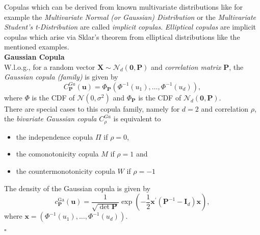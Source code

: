
Copulas which can be derived from known multivariate distributions like for example the \textit{Multivariate Normal (or Gaussian) Distribution} or the \textit{Multivariate Student's t-Distribution} are called \textit{implicit copulas}. \textit{Elliptical copulas} are implicit copulas which arise via Sklar's theorem from elliptical distributions like the mentioned examples.\\

\textbf{Gaussian Copula}\\
W.l.o.g., for a random vector $\bm{X} \sim {\mathcal{N}_{d}(\bm{0}, \mathbf{P})} $ and \textit{correlation matrix} $\bm{P}$,
the \textit{Gaussian copula (family)} is given by
\begin{equation}
C_{\mathbf{P}}^{G a}(\mathbf{u})=\Phi_{\mathbf{P}}\left(\Phi^{-1}\left(u_{1}\right), \ldots, \Phi^{-1}\left(u_{d}\right)\right),
\end{equation}
where $\Phi$ is the \ac{CDF} of $\mathcal{N}(0, \sigma^{2})$ and 
$\Phi_{\bm{P}}$ is the \ac{CDF} of $\mathcal{N}_{d}(\bm{0}, \mathbf{P})$.\\
There are special cases to this copula family, namely for $d=2$ and correlation $\rho$, the \textit{bivariate Gaussian copula} $C_{\rho}^{G a}$ is equivalent to
\begin{itemize}
\item the independence copula $\Pi$ if $\rho = 0$,
\item the comonotonicity copula $M$ if $\rho = 1$ and
\item the countermonotonicity copula $W$ if $\rho = -1$
\end{itemize}
The density of the Gaussian copula is given by
\begin{equation}
c_{\bm{P}}^{\mathrm{Ga}}(\boldsymbol{u})=\frac{1}{\sqrt{\operatorname{det} \bm{P}}} \exp \left(-\frac{1}{2} \boldsymbol{x}^{\prime}\left(\bm{P}^{-1}-\bm{I}_{d}\right) \boldsymbol{x}\right),
\end{equation}
where $\bm{x} = \left(\Phi^{-1}\left(u_{1}\right), \ldots, \Phi^{-1}\left(u_{d}\right)\right)$.

\hfill $\square$ \\

